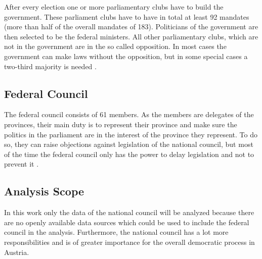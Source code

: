 After every election one or more parliamentary clubs have to build the government. These parliament clubs have to have in total at least 92 mandates (more than half of the overall mandates of 183). Politicians of the government are then selected to be the federal ministers. All other parliamentary clubs, which are not in the government are in the so called opposition. In most cases the government can make laws without the opposition, but in some special cases a two-third majority is needed \cite{AustrianParliament_2015}.

\subsection{Federal Council}
The federal council consists of 61 members. As the members are delegates of the provinces, their main duty is to represent their province and make sure the politics in the parliament are in the interest of the province they represent. To do so, they can raise objections against legislation of the national council, but most of the time the federal council only has the power to delay legislation and not to prevent it \cite{AustrianParliament_2015}.

\subsection{Analysis Scope}
In this work only the data of the national council will be analyzed because there are no openly available data sources which could be used to include the federal council in the analysis. Furthermore, the national council has a lot more responsibilities and is of greater importance for the overall democratic process in Austria.